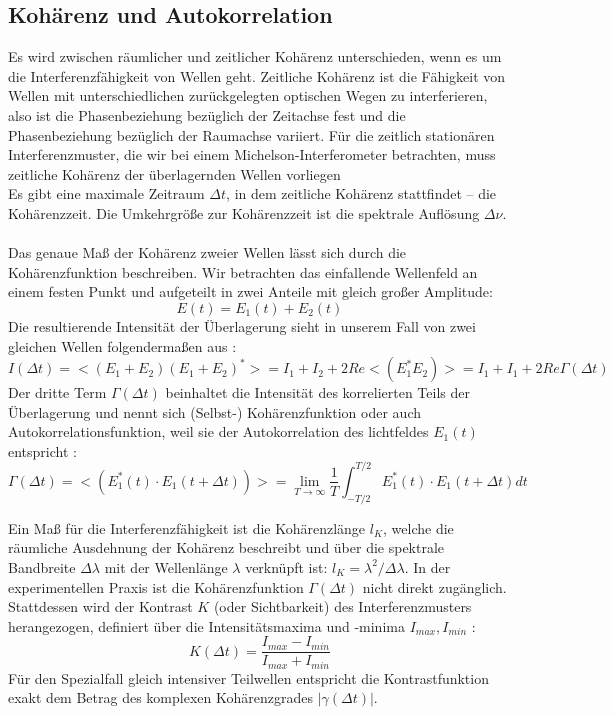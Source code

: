 \documentclass[10pt,a4paper]{article}
\begin{document}
\subsection{Kohärenz und Autokorrelation}
Es wird zwischen räumlicher und zeitlicher Kohärenz unterschieden, wenn es um die Interferenzfähigkeit von Wellen geht. Zeitliche Kohärenz ist die Fähigkeit von Wellen mit unterschiedlichen zurückgelegten optischen Wegen zu interferieren, also ist die Phasenbeziehung bezüglich der Zeitachse fest und die Phasenbeziehung bezüglich der Raumachse variiert. Für die zeitlich stationären Interferenzmuster, die wir bei einem Michelson-Interferometer betrachten, muss zeitliche Kohärenz der überlagernden Wellen vorliegen\\
Es gibt eine maximale Zeitraum $\Delta t$, in dem zeitliche Kohärenz stattfindet -- die Kohärenzzeit. Die Umkehrgröße zur Kohärenzzeit ist die spektrale Auflösung $\Delta\nu$. \cite{2}\\\\
Das genaue Maß der Kohärenz zweier Wellen lässt sich durch die Kohärenzfunktion beschreiben.
Wir betrachten das einfallende Wellenfeld an einem festen Punkt und aufgeteilt in zwei Anteile mit gleich großer Amplitude:
$$E(t)=E_1(t)+E_2(t)$$
Die resultierende Intensität der Überlagerung sieht in unserem Fall von zwei gleichen Wellen folgendermaßen aus \cite{2}:
\begin{equation}
I(\Delta t)=<(E_1+E_2)(E_1+E_2)^*>=I_1+I_2+2Re<(E^*_1E_2)>=I_1+I_1+2Re\Gamma(\Delta t)
\end{equation}
Der dritte Term $\Gamma(\Delta t)$ beinhaltet die Intensität des korrelierten Teils der Überlagerung und nennt sich (Selbst-) Kohärenzfunktion oder auch Autokorrelationsfunktion, weil sie der Autokorrelation des lichtfeldes $E_1(t)$ entspricht \cite{2}:
\begin{equation}
\Gamma(\Delta t)=<(E^*_1(t)\cdot E_1(t+\Delta t))> = \lim_{T\to\infty}\frac{1}{T}\int^{T/2}_{-T/2}E^*_1(t)\cdot E_1(t+\Delta t)dt
\end{equation}

Ein Maß für die Interferenzfähigkeit ist die Kohärenzlänge $l_K$, welche die räumliche Ausdehnung der Kohärenz beschreibt und über die spektrale Bandbreite $\Delta\lambda$ mit der Wellenlänge $\lambda$ verknüpft ist: $l_K = \lambda^2 / \Delta\lambda$. 
In der experimentellen Praxis ist die Kohärenzfunktion $\Gamma(\Delta t)$ nicht direkt zugänglich. Stattdessen wird der Kontrast $K$ (oder Sichtbarkeit) des Interferenzmusters herangezogen, definiert über die Intensitätsmaxima und -minima $I_{max}, I_{min}$ \cite{2}:
\begin{equation}
K(\Delta t) = \frac{I_{max} - I_{min}}{I_{max} + I_{min}}
\end{equation}
Für den Spezialfall gleich intensiver Teilwellen entspricht die Kontrastfunktion exakt dem Betrag des komplexen Kohärenzgrades $|\gamma(\Delta t)|$. \cite{2}
\end{document}
